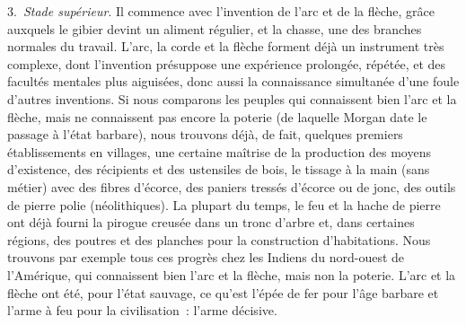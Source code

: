 \documentclass[french,twoside]{book} %
\newif\ifdev
\renewcommand{\LettrineFontHook}{\color{rubric}}
\newcommand{\initialiv}[2]{%
  \let\oldLFH\LettrineFontHook
  \IfSubStr{QJ’}{#1}{
    \lettrine[lines=4, lhang=0.2, loversize=-0.1, lraise=0.2]{\smash{#1}}{#2}
  }{\IfSubStr{É}{#1}{
    \lettrine[lines=4, lhang=0.2, loversize=-0, lraise=0]{\smash{#1}}{#2}
  }{\IfSubStr{ÀÂ}{#1}{
    \lettrine[lines=4, lhang=0.2, loversize=-0, lraise=0, slope=0.6em]{\smash{#1}}{#2}
  }{\IfSubStr{A}{#1}{
    \lettrine[lines=4, lhang=0.2, loversize=0.2, slope=0.6em]{\smash{#1}}{#2}
  }{\IfSubStr{V}{#1}{
    \lettrine[lines=4, lhang=0.2, loversize=0.2, slope=-0.5em]{\smash{#1}}{#2}
  }{
    \lettrine[lines=4, lhang=0.2, loversize=0.2]{\smash{#1}}{#2}
  }}}}}
  \let\LettrineFontHook\oldLFH
}
\renewcommand{\LettrineFontHook}{\bfseries\color{rubric}}
\begin{document}
3. \emph{Stade supérieur}. Il commence avec l’invention de l’arc et de la flèche, grâce auxquels le gibier devint un aliment régulier, et la chasse, une des branches normales du travail. L’arc, la corde et la flèche forment déjà un instrument très complexe, dont l’invention présuppose une expérience prolongée, répétée, et des facultés mentales plus aiguisées, donc aussi la connaissance simultanée d’une foule d’autres inventions. Si nous comparons les peuples qui connaissent bien l’arc et la flèche, mais ne connaissent pas encore la poterie (de laquelle Morgan date le passage à l’état barbare), nous trouvons déjà, de fait, quelques premiers établissements en villages, une certaine maîtrise de la production des moyens d’existence, des récipients et des ustensiles de bois, le tissage à la main (sans métier) avec des fibres d’écorce, des paniers tressés d’écorce ou de jonc, des outils de pierre polie (néolithiques). La plupart du temps, le feu et la hache de pierre ont déjà fourni la pirogue creusée dans un tronc d’arbre et, dans certaines régions, des poutres et des planches pour la construction d’habitations. Nous trouvons par exemple tous ces progrès chez les Indiens du nord-ouest de l’Amérique, qui connaissent bien l’arc et la flèche, mais non la poterie. L’arc et la flèche ont été, pour l’état sauvage, ce qu’est l’épée de fer pour l’âge barbare et l’arme à feu pour la civilisation : l’arme décisive.
 


\ifbooklet
  \newpage\null\thispagestyle{empty}\newpage
\fi

\ifdev %
\fontname\font — \textsc{Les règles du jeu}\par
(\hyperref[utopie]{\underline{Lien}})\par
\noindent \initialiv{A}{lors là}\blindtext\par
\noindent \initialiv{À}{ la bonheur des dames}\blindtext\par
\noindent \initialiv{É}{tonnez-le}\blindtext\par
\noindent \initialiv{Q}{ualitativement}\blindtext\par
\noindent \initialiv{V}{aloriser}\blindtext\par
\Blindtext
\phantomsection
\label{utopie}
\Blinddocument
\fi
\end{document}
